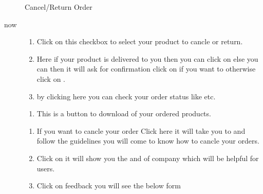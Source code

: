 \documentclass[a4paper,10pt,english]{report}
\begin{document}
\begin{figure}[htbp]
\centering
\capstart

\noindent{}
\caption{Cancel/Return Order}\label{\detokenize{index:id20}}\label{\detokenize{index:id10}}\end{figure}
\begin{description}
\item[{now}] \leavevmode\begin{enumerate}
\def\theenumi{\alph{enumi}}
\def\labelenumi{\theenumi .}
\makeatletter\def\p@enumii{\p@enumi \theenumi .}\makeatother
\item {} 
Click on this checkbox to select your product to cancle or return.

\item {} 
Here if your product is delivered to you then you can click on  else you can  then it will ask for confirmation click on  if you want to  otherwise click on  .

\item {} 
by clicking here you can check your order status like   etc.

\end{enumerate}
\begin{enumerate}
\def\theenumi{\alph{enumi}}
\def\labelenumi{\theenumi .}
\makeatletter\def\p@enumii{\p@enumi \theenumi .}\makeatother
\setcounter{enumi}{3}
\item {} 
This is a button to download  of your ordered products.

\end{enumerate}
\begin{enumerate}
\def\theenumi{\arabic{enumi}}
\def\labelenumi{\theenumi .}
\makeatletter\def\p@enumii{\p@enumi \theenumi .}\makeatother
\setcounter{enumi}{10}
\item {} 
If you want to cancle your order Click here it will take you to {\hyperref[\detokenize{index:id9}]{}} and follow the guidelines you will come to  know how to cancle your orders.

\item {} 
Click on  it will show you the  and   of company which will be helpful for users.

\item {} 
Click on feedback you will see the below form

\end{enumerate}

\end{description}
\end{document}
